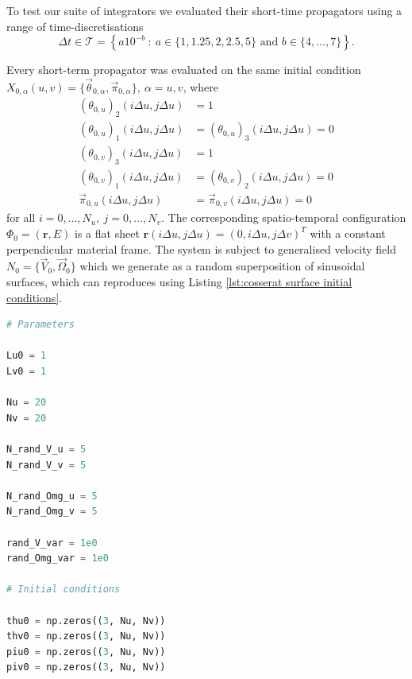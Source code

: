 \documentclass[withindex,glossary,techreport]{cam-thesis}
\begin{document}
\begin{appendices}
To test our suite of integrators we evaluated their short-time propagators using a range of time-discretisations
\begin{equation} \label{eq:cosserat dts}
	\Delta t \in \mathcal{T} = \left\{ a 10^{-b}\ :\ a \in \{1, 1.25, 2, 2.5, 5 \} \text{ and } b \in \{ 4, \dots, 7 \} \right\}.
\end{equation}

Every short-term propagator was evaluated on the same initial condition $X_{0,\alpha}(u,v) = \{ \vec{\theta}_{0,\alpha}, \vec{\pi}_{0,\alpha} \},\ \alpha=u,v$, where
\begin{subequations}
	\begin{align}
		(\theta_{0,u})_2(i\Delta u, j \Delta u) & = 1 \\
		(\theta_{0,u})_1(i\Delta u, j \Delta u) & = (\theta_{0,u})_3(i\Delta u, j \Delta u) = 0 \\
		(\theta_{0,v})_3(i\Delta u, j \Delta u) & = 1 \\
		(\theta_{0,v})_1(i\Delta u, j \Delta u) & = (\theta_{0,v})_2(i\Delta u, j \Delta u) = 0 \\
		\vec{\pi}_{0,u}(i\Delta u, j \Delta u) & = \vec{\pi}_{0,v}(i\Delta u, j \Delta u) = 0
	\end{align}
\end{subequations}
for all $i = 0,\dots, N_u,\ j=0,\dots,N_v$. The corresponding spatio-temporal configuration $\Phi_0 = (\mathbf{r}, E)$ is a flat sheet $\mathbf{r}(i \Delta u, j \Delta u)  = (0, i \Delta u, j \Delta v )^T$ with a constant perpendicular material frame. The system is subject to generalised velocity field $N_0 = \{ \vec{V}_0, \vec{\Omega}_0 \}$ which we generate as a random superposition of sinusoidal surfaces, which can reproduces using Listing \ref{lst:cosserat surface initial conditions}.

\begin{lstlisting}[language=Python, caption=Setting up initial conditions nad generating random velocity fields., label={lst:cosserat surface initial conditions}]
# Parameters

Lu0 = 1
Lv0 = 1

Nu = 20
Nv = 20

N_rand_V_u = 5
N_rand_V_v = 5

N_rand_Omg_u = 5
N_rand_Omg_v = 5

rand_V_var = 1e0
rand_Omg_var = 1e0

# Initial conditions

thu0 = np.zeros((3, Nu, Nv))
thv0 = np.zeros((3, Nu, Nv))
piu0 = np.zeros((3, Nu, Nv))
piv0 = np.zeros((3, Nu, Nv))


\end{lstlisting}
\end{appendices}
\end{document}
